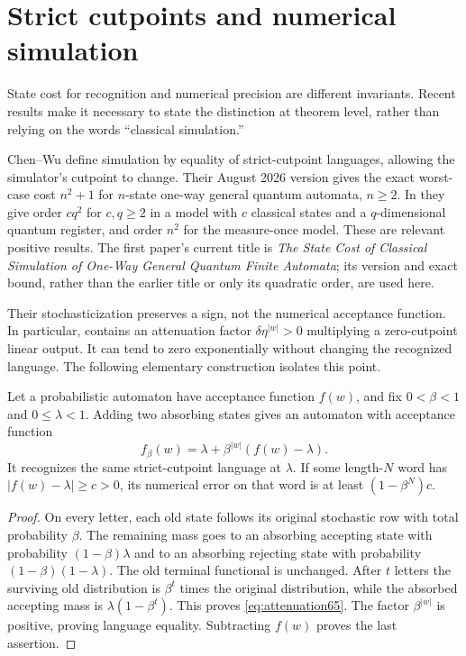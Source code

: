 \section{Strict cutpoints and numerical simulation}\label{sec:cutpoint65}
State cost for recognition and numerical precision are different
invariants. Recent results make it necessary to state the distinction
at theorem level, rather than relying on the words ``classical
simulation.''

Chen--Wu \cite[Definition~2.1 and Theorems~3.2, 4.4]{CWApril65}
define simulation by equality of strict-cutpoint languages, allowing
the simulator's cutpoint to change. Their August 2026 version gives
the exact worst-case cost $n^2+1$ for $n$-state one-way general
quantum automata, $n\ge2$. In \cite[Theorems~11, 14 and Corollary~15]{CWMay65}
they give order $cq^2$ for $c,q\ge2$ in a model with $c$ classical states and
a $q$-dimensional quantum register, and order $n^2$ for the
measure-once model. These are relevant positive results. The first
paper's current title is \emph{The State Cost of Classical Simulation
of One-Way General Quantum Finite Automata}; its version and exact
bound, rather than the earlier title or only its quadratic order,
are used here.

Their stochasticization preserves a sign, not the numerical
acceptance function. In particular,
\cite[Proposition~3.1]{CWApril65} contains an attenuation factor
$\delta\eta^{|w|}>0$ multiplying a zero-cutpoint linear output.
It can tend to zero exponentially without changing the recognized
language. The following elementary construction isolates this point.

\begin{proposition}
\label{prop:attenuation65}
Let a probabilistic automaton have acceptance function $f(w)$, and
fix $0<\beta<1$ and $0\le\lambda<1$. Adding two absorbing states
gives an automaton with acceptance function
\begin{equation}\label{eq:attenuation65}
             f_\beta(w)=\lambda+\beta^{|w|}(f(w)-\lambda).
\end{equation}
It recognizes the same strict-cutpoint language at $\lambda$.
If some length-$N$ word has $|f(w)-\lambda|\ge c>0$, its numerical
error on that word is at least $(1-\beta^N)c$.
\end{proposition}
\begin{proof}
On every letter, each old state follows its original stochastic row
with total probability $\beta$. The remaining mass goes to an
absorbing accepting state with probability $(1-\beta)\lambda$ and
to an absorbing rejecting state with probability
$(1-\beta)(1-\lambda)$. The old terminal functional is unchanged.
After $t$ letters the surviving old distribution is $\beta^t$
times the original distribution, while the absorbed accepting mass
is $\lambda(1-\beta^t)$. This proves \eqref{eq:attenuation65}.
The factor $\beta^{|w|}$ is positive, proving language equality.
Subtracting $f(w)$ proves the last assertion.
\end{proof}

